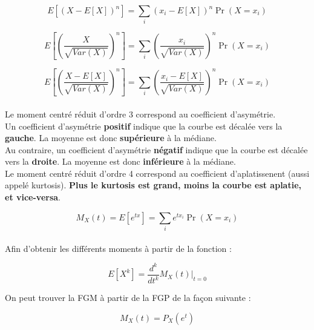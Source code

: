 \documentclass[10pt, french]{article}
\begin{document}
\begin{multicols*}{2}
\begin{definitionNOHFILLprop}
$$E[(X-E[X])^n] = \sum_i (x_i-E[X])^n \Pr(X = x_i)$$
\end{definitionNOHFILLprop}

\begin{definitionNOHFILLprop}
$$E\left[\left(\frac{X}{\sqrt{Var(X)}}\right)^n\right] = \sum_i \left(\frac{x_i}{\sqrt{Var(X)}}\right)^n \Pr(X = x_i)$$
\end{definitionNOHFILLprop}

\begin{definitionNOHFILLprop}
$$E\left[\left(\frac{X-E[X]}{\sqrt{Var(X)}}\right)^n\right] = \sum_i \left(\frac{x_i-E[X]}{\sqrt{Var(X)}}\right)^n \Pr(X = x_i)$$\\

Le moment centré réduit d'ordre 3 correspond au coefficient d'asymétrie.\\

Un coefficient d'asymétrie \textbf{positif} indique que la courbe est décalée vers la \textbf{gauche}. La moyenne est donc \textbf{supérieure} à la médiane. \\

Au contraire, un coefficient d'asymétrie \textbf{négatif} indique que la courbe est décalée vers la \textbf{droite}. La moyenne est donc \textbf{inférieure} à la médiane.\\

Le moment centré réduit d'ordre 4 correspond au coefficient d'aplatissenent (aussi appelé kurtosis). \textbf{Plus le kurtosis est \textbf{grand}, moins la courbe est aplatie, et vice-versa}.
\end{definitionNOHFILLprop}

\begin{definitionNOHFILLprop}

$$M_X(t) = E[e^{tx}] = \sum_i e^{tx_i} \Pr(X = x_i)$$\\

Afin d'obtenir les différents moments à partir de la fonction :

$$E[X^k] = \frac{d^k}{dt^k}M_X(t) \bigg\rvert_{t=0}$$

On peut trouver la FGM à partir de la FGP de la façon suivante :

$$M_X(t) = P_X(e^t)$$

\end{definitionNOHFILLprop}


\end{multicols*}
\end{document}
